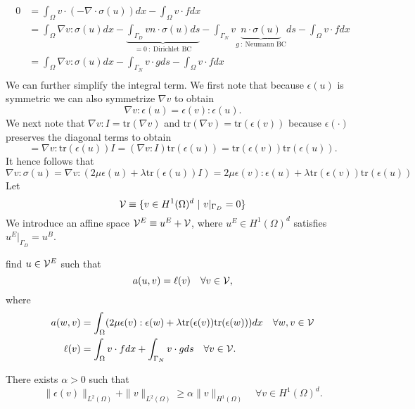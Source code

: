 \begin{align*}
  0 &= 
  \int_{\Omega} v \cdot (-\nabla \cdot \sigma(u) ) dx - \int_{\Omega} v \cdot f dx \\
  &=
  \int_{\Omega} \nabla v : \sigma (u) dx - \underbrace{ \int_{\Gamma_D} v n \cdot \sigma(u) ds}_{= 0 \ : \ \text{Dirichlet BC}} - \int_{\Gamma_{N}} v \underbrace{ n \cdot \sigma(u)}_{g \ : \ \text{Neumann BC}} ds - \int_{\Omega} v \cdot f dx \\
  &=
  \int_{\Omega} \nabla v : \sigma (u) dx - \int_{\Gamma_N} v \cdot g ds - \int_{\Omega} v \cdot f dx \\
\end{align*}
We can further simplify the integral term.  We first note that because $\epsilon(u)$ is symmetric we can also symmetrize $\nabla v$ to obtain
\begin{equation*}
  \nabla v : \epsilon(u) = \epsilon(v) : \epsilon(u) .
\end{equation*}
We next note that $\nabla v: I = \text{tr}(\nabla v)$ and $\text{tr}(\nabla v) = \text{tr}(\epsilon(v))$ because $\epsilon(\cdot)$ preserves the diagonal terms to obtain
\begin{equation*}
  = \nabla v : \text{tr}(\epsilon(u)) I 
  = (\nabla v : I) \text{tr}(\epsilon(u)) 
  = \text{tr}(\epsilon(v)) \text{tr}(\epsilon(u)).
\end{equation*}
It hence follows that
\begin{equation*}
  \nabla v : \sigma(u) = \nabla v : (2 \mu \epsilon(u) + \lambda \text{tr}(\epsilon(u)) I )
  = 2 \mu \epsilon(v) : \epsilon(u) + \lambda \text{tr}(\epsilon(v)) \text{tr}(\epsilon(u))
\end{equation*}
Let
\begin{equation*}
  \mathcal{V} \equiv \{ v \in H^1(\Omega)^d \ | \ v|_{\Gamma_D} = 0 \}
\end{equation*}
We introduce an affine space $\mathcal{V}^E \equiv u^E + \mathcal{V}$, where $u^E \in H^1(\Omega)^d$ satisfies $u^E|_{\Gamma_D} = u^B$.

find $u \in \mathcal{V}^E$ such that
\begin{equation*}
  a(u,v) = \ell(v) \quad \forall v \in \mathcal{V},
\end{equation*}
where
\begin{align*}
  a(w,v) &= \int_{\Omega} ( 2 \mu \epsilon(v) : \epsilon(w) + \lambda \text{tr}(\epsilon(v)) \text{tr}(\epsilon(w)) ) dx \quad \forall w, v \in \mathcal{V} \\
  \ell(v) &=   \int_{\Omega} v \cdot f dx + \int_{\Gamma_N} v \cdot g ds \quad \forall v \in \mathcal{V}.
\end{align*}

\begin{theorem}
  There exists $\alpha > 0$ such that
  \begin{equation*}
    \| \epsilon(v) \|_{L^2(\Omega)} + \| v \|_{L^2(\Omega)} \geq \alpha \| v \|_{H^1(\Omega)} \quad \forall v \in H^1(\Omega)^d.
  \end{equation*}

\end{theorem}
